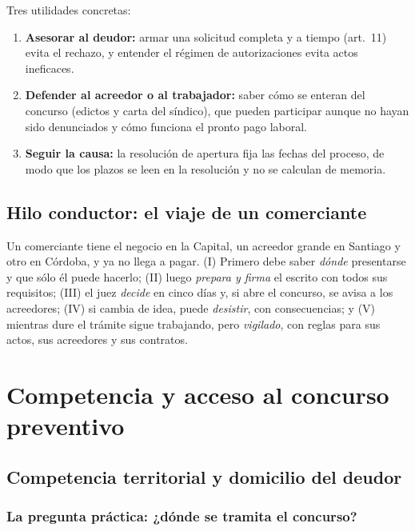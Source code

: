 \documentclass[12pt,oneside]{book}
\begin{document}
Tres utilidades concretas:
\begin{enumerate}
    \item \textbf{Asesorar al deudor:} armar una solicitud completa y a tiempo (art.~11) evita el rechazo, y entender el régimen de autorizaciones evita actos ineficaces.
    \item \textbf{Defender al acreedor o al trabajador:} saber cómo se enteran del concurso (edictos y carta del síndico), que pueden participar aunque no hayan sido denunciados y cómo funciona el pronto pago laboral.
    \item \textbf{Seguir la causa:} la resolución de apertura fija las fechas del proceso, de modo que los plazos se leen en la resolución y no se calculan de memoria.
\end{enumerate}

\section*{Hilo conductor: el viaje de un comerciante}

Un comerciante tiene el negocio en la Capital, un acreedor grande en Santiago y otro en Córdoba, y ya no llega a pagar. (I) Primero debe saber \textit{dónde} presentarse y que sólo él puede hacerlo; (II) luego \textit{prepara y firma} el escrito con todos sus requisitos; (III) el juez \textit{decide} en cinco días y, si abre el concurso, se avisa a los acreedores; (IV) si cambia de idea, puede \textit{desistir}, con consecuencias; y (V) mientras dure el trámite sigue trabajando, pero \textit{vigilado}, con reglas para sus actos, sus acreedores y sus contratos.

\chapter[Competencia y acceso]{Competencia y acceso al concurso preventivo}

\section{Competencia territorial y domicilio del deudor}

\subsection{La pregunta práctica: ¿dónde se tramita el concurso?}
\end{document}
